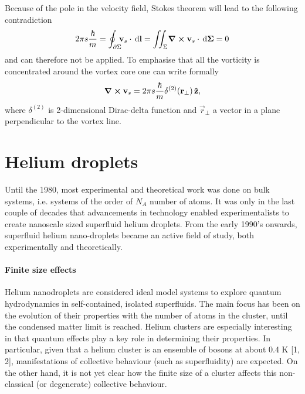 			Because of the pole in the velocity field, Stokes theorem will lead to the following contradiction
			\begin{align}
				2\pi s\frac{\hbar}{m}=\oint_{\partial\Sigma}\!\!\!\bm{\mathrm{v}}_s\cdot\,\mathrm{d}\bm{\mathrm{l}} = \iint_{\Sigma}\!\curl{\bm{\mathrm{v}}_s}\cdot\,\mathrm{d}\bm{\mathrm{\Sigma}} = 0
			\end{align}
			and can therefore not be applied. To emphasise that all the vorticity is concentrated around the vortex core one can write formally
			\begin{align}
				\curl{\bm{\mathrm{v}}_s} = 2\pi s\frac{\hbar}{m}\delta^{(2)}(\bm{\mathrm{r}}_\perp)\,\vu{z},
			\end{align}
			where $\delta^{(2)}$ is 2-dimensional Dirac-delta function and $\vec{r}_\perp$ a vector in a plane perpendicular to the vortex line.

	\section{Helium droplets}\label{sec:helium-droplets}
		Until the 1980, most experimental and theoretical work was done on bulk systems, i.e. systems of the order of $N_A$ number of atoms. It was only in the last couple of decades that advancements in technology enabled experimentalists to create nanoscale sized superfluid helium droplets. From the early 1990's onwards, superfluid helium nano-droplets became an active field of study, both experimentally and theoretically. 
		
		\paragraph{Finite size effects} Helium nanodroplets are considered ideal model systems to explore quantum hydrodynamics in self-contained, isolated superfluids. The main focus has been on the evolution of their properties with the number of atoms in the cluster, until the condensed matter limit is reached. Helium clusters are especially interesting in that quantum effects play a key role in determining their properties. In particular, given that a helium cluster is an ensemble of bosons at about 0.4 K [1, 2], manifestations of collective behaviour (such as superfluidity) are expected. On the other hand, it is not yet clear how the finite size of a cluster affects this non-classical (or degenerate) collective behaviour.

